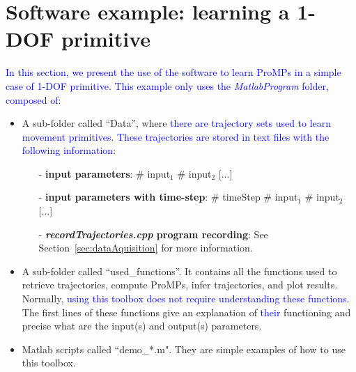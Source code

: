 \documentclass[utf8]{frontiersSCNS} %
\newcommand{\rev}[1]{\textcolor{blue}{#1}}
\begin{document}
\section{Software example: learning a 1-DOF primitive}
\label{sec:example1DOF}
\rev{In this section, we present the use of the software to learn ProMPs in a simple case of 1-DOF primitive. This example only uses the \textit{MatlabProgram} folder, composed of:}
\begin{itemize}
\item A sub-folder called ``Data'', where \rev{there are trajectory sets used to learn movement primitives. These trajectories are stored in text files with the following information}:
\begin{itemize}
\item [-] \textbf{input parameters}: \# input$_1$ \# input$_2$ [...]
\item [-] \textbf{input parameters with time-step}: \# timeStep \# input$_1$ \# input$_2$ [...]
\item [-] \textbf{\textit{recordTrajectories.cpp} program recording}: See Section~\ref{sec:dataAquisition} for more information.
\end{itemize}
\item A sub-folder called ``used\_functions''. It contains all the functions used to retrieve trajectories, compute ProMPs, infer trajectories, and plot results. Normally, \rev{using this toolbox does not require understanding these functions. }
The first lines of these functions give an explanation of \rev{their} functioning and precise what are the input(s) and output(s) parameters.
\item Matlab scripts called ``demo\_*.m". They are simple examples of how to use this toolbox.
\end{itemize}
\end{document}
